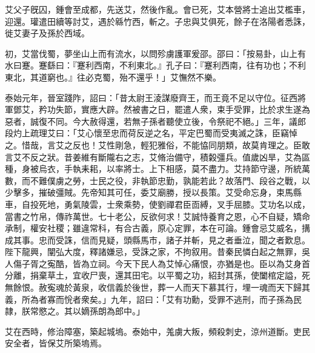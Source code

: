 \begin{pinyinscope}
 
艾父子旣囚，鍾會至成都，先送艾，然後作亂。會已死，艾本營將士追出艾檻車，迎還。瓘遣田續等討艾，遇於緜竹西，斬之。子忠與艾俱死，餘子在洛陽者悉誅，徙艾妻子及孫於西域。
 
 
初，艾當伐蜀，夢坐山上而有流水，以問殄虜護軍爰邵。邵曰：「按易卦，山上有水曰蹇。蹇繇曰：『蹇利西南，不利東北。』孔子曰：『蹇利西南，往有功也；不利東北，其道窮也。』往必克蜀，殆不還乎！」艾憮然不樂。
 
 
 
 
 泰始元年，晉室踐阼，詔曰：「昔太尉王淩謀廢齊王，而王竟不足以守位。征西將軍鄧艾，矜功失節，實應大辟。然被書之日，罷遣人衆，束手受罪，比於求生遂為惡者，誠復不同。今大赦得還，若無子孫者聽使立後，令祭祀不絕。」三年，議郎段灼上疏理艾曰：「艾心懷至忠而荷反逆之名，平定巴蜀而受夷滅之誅，臣竊悼之。惜哉，言艾之反也！艾性剛急，輕犯雅俗，不能恊同朋類，故莫肯理之。臣敢言艾不反之狀。昔姜維有斷隴右之志，艾脩治備守，積糓彊兵。值歲凶旱，艾為區種，身被烏衣，手執耒耜，以率將士。上下相感，莫不盡力。艾持節守邊，所統萬數，而不難僕虜之勞，士民之役，非執節忠勤，孰能若此？故落門、段谷之戰，以少擊多，摧破彊賊。先帝知其可任，委艾廟勝，授以長策。艾受命忘身，束馬縣車，自投死地，勇氣陵雲，士衆乘勢，使劉禪君臣靣縛，叉手屈膝。艾功名以成，當書之竹帛，傳祚萬世。七十老公，反欲何求！艾誠恃養育之恩，心不自疑，矯命承制，權安社稷；雖違常科，有合古義，原心定罪，本在可論。鍾會忌艾威名，搆成其事。忠而受誅，信而見疑，頭縣馬巿，諸子并斬，見之者垂泣，聞之者歎息。陛下龍興，闡弘大度，釋諸嫌忌，受誅之家，不拘叙用。昔秦民憐白起之無罪，吳人傷子胥之寃酷，皆為立祠。今天下民人為艾悼心痛恨，亦猶是也。臣以為艾身首分離，捐棄草土，宜收尸喪，還其田宅。以平蜀之功，紹封其孫，使闔棺定謚，死無餘恨。赦寃魂於黃泉，收信義於後世，葬一人而天下慕其行，埋一魂而天下歸其義，所為者寡而恱者衆矣。」九年，詔曰：「艾有功勳，受罪不逃刑，而子孫為民隷，朕常愍之。其以嫡孫朗為郎中。」
 
 
艾在西時，修治障塞，築起城塢。泰始中，羗虜大叛，頻殺刺史，涼州道斷。吏民安全者，皆保艾所築塢焉。
 

\end{pinyinscope}
